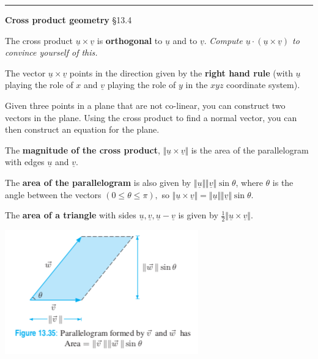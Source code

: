 \documentclass[12pt,letterpaper,noanswers]{exam}
\newcommand{\mb}[1]{\underline{#1}}
\begin{document}
\vspace{0.2cm}
\hrule
\vspace{0.2cm}

\noindent\textbf{Cross product geometry} \S 13.4
\begin{tcolorbox}
The cross product $\mb{u}\times\mb{v}$ is \textbf{orthogonal} to $\mb{u}$ and to $\mb{v}$.  \emph{Compute $\mb{u}\cdot(\mb{u}\times\mb{v})$ to convince yourself of this.}

The vector $\mb{u}\times\mb{v}$ points in the direction given by the \textbf{right hand rule} (with $\mb{u}$ playing the role of $x$ and $\mb{v}$ playing the role of $y$ in the $xyz$ coordinate system).

Given three points in a plane that are not co-linear, you can construct two vectors in the plane.  Using the cross product to find a normal vector, you can then construct an equation for the plane.
\end{tcolorbox}

\begin{tcolorbox}
The \textbf{magnitude of the cross product}, $\Vert \mb{u}\times\mb{v}\Vert$ is the area of the parallelogram with edges $\mb{u}$ and $\mb{v}$.

The \textbf{area of the parallelogram} is also given by $\Vert \mb{u}\Vert\Vert\mb{v}\Vert\sin\theta$, where $\theta$ is the angle between the vectors $(0\leq \theta \leq \pi),$ so $\Vert \mb{u}\times \mb{v}\Vert = \Vert\mb{u}\Vert\Vert \mb{v} \Vert \sin \theta$.

The \textbf{area of a triangle} with sides $\mb{u}, \mb{v}, \mb{u}-\mb{v}$ is given by $\frac{1}{2}\Vert\mb{u}\times\mb{v}\Vert.$




\end{tcolorbox}

\includegraphics[scale=0.7]{img/C05parallelogram.png}
\end{document}
